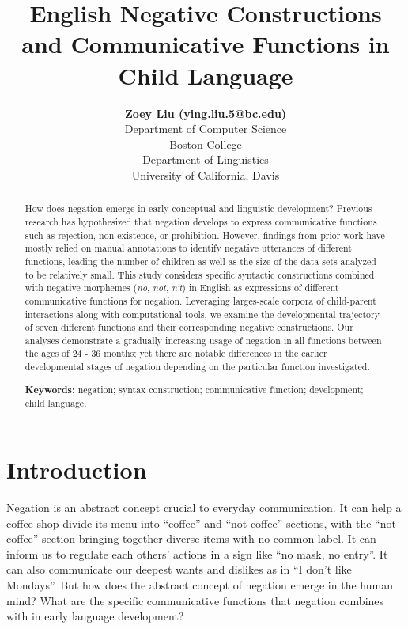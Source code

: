 \documentclass[10pt, letterpaper]{article}
\title{English Negative Constructions and Communicative Functions in Child
Language}
\author{{\large \bf Zoey Liu (ying.liu.5@bc.edu)} \\ Department of Computer Science \\ Boston College \AND {\large \bf Masoud Jasbi (jasbi@ucdavis.edu)} \\ Department of Linguistics \\ University of California, Davis}
\begin{document}
\maketitle

\begin{abstract}
How does negation emerge in early conceptual and linguistic development?
Previous research has hypothesized that negation develops to express
communicative functions such as rejection, non-existence, or
prohibition. However, findings from prior work have mostly relied on
manual annotations to identify negative utterances of different
functions, leading the number of children as well as the size of the
data sets analyzed to be relatively small. This study considers specific
syntactic constructions combined with negative morphemes (\emph{no},
\emph{not}, \emph{n't}) in English as expressions of different
communicative functions for negation. Leveraging larges-scale corpora of
child-parent interactions along with computational tools, we examine the
developmental trajectory of seven different functions and their
corresponding negative constructions. Our analyses demonstrate a
gradually increasing usage of negation in all functions between the ages
of 24 - 36 months; yet there are notable differences in the earlier
developmental stages of negation depending on the particular function
investigated.

\textbf{Keywords:}
negation; syntax construction; communicative function; development;
child language.
\end{abstract}

\hypertarget{introduction}{%
\section{Introduction}\label{introduction}}

Negation is an abstract concept crucial to everyday communication. It
can help a coffee shop divide its menu into ``coffee'' and ``not
coffee'' sections, with the ``not coffee'' section bringing together
diverse items with no common label. It can inform us to regulate each
others' actions in a sign like ``no mask, no entry''. It can also
communicate our deepest wants and dislikes as in ``I don't like
Mondays''. But how does the abstract concept of negation emerge in the
human mind? What are the specific communicative functions that negation
combines with in early language development?
\end{document}
